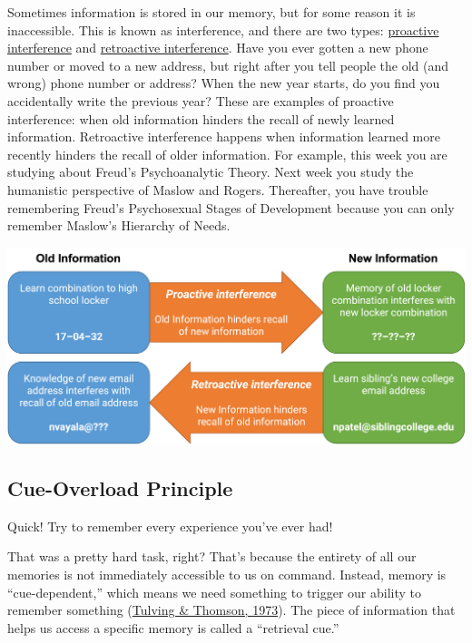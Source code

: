 \documentclass[
]{krantz}
\begin{document}
Sometimes information is stored in our memory, but for some reason it is inaccessible. This is known as interference, and there are two types: \protect\hyperlink{proactive-interference}{proactive interference} and \protect\hyperlink{retroactive-interference}{retroactive interference}. Have you ever gotten a new phone number or moved to a new address, but right after you tell people the old (and wrong) phone number or address? When the new year starts, do you find you accidentally write the previous year? These are examples of proactive interference: when old information hinders the recall of newly learned information. Retroactive interference happens when information learned more recently hinders the recall of older information. For example, this week you are studying about Freud's Psychoanalytic Theory. Next week you study the humanistic perspective of Maslow and Rogers. Thereafter, you have trouble remembering Freud's Psychosexual Stages of Development because you can only remember Maslow's Hierarchy of Needs.

\begin{center}\includegraphics[width=0.9\linewidth]{images/ch6/fig4} \end{center}

\hypertarget{cue-overload-principle}{%
\subsection*{Cue-Overload Principle}\label{cue-overload-principle}}


Quick! Try to remember every experience you've ever had!

That was a pretty hard task, right? That's because the entirety of all our memories is not immediately accessible to us on command. Instead, memory is ``cue-dependent,'' which means we need something to trigger our ability to remember something (\protect\hyperlink{ref-tulving1973encoding}{Tulving \& Thomson, 1973}). The piece of information that helps us access a specific memory is called a ``retrieval cue.''
\end{document}
